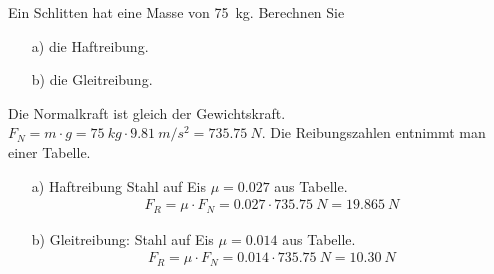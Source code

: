 
\begin{aufgabe}
	Ein Schlitten hat eine Masse von \SI{75}{kg}.
	Berechnen Sie
	\begin{itemize}
		\item [a)] die Haftreibung.
		\item [b)] die Gleitreibung.
	\end{itemize}
	\begin{loesung}
		Die Normalkraft ist gleich der Gewichtskraft. $F_N=m\cdot g=\SI{75}{kg}\cdot\SI{9.81}{m/s^2}=\SI{735.75}{N}$.
		Die Reibungszahlen entnimmt man einer Tabelle.
		\begin{itemize}
			\item[a)] Haftreibung Stahl auf Eis $\mu= 0.027$ aus Tabelle.%
				\begin{eqnarray*}
					F_R=\mu\cdot F_N= \num{0.027}\cdot\SI{735.75}{N}=\SI{19.865}{N}
				\end{eqnarray*}
			\item[b)] Gleitreibung: Stahl auf Eis $\mu= 0.014$ aus Tabelle.%
				\begin{eqnarray*}
					F_R=\mu\cdot F_N=\num{0.014}\cdot\SI{735.75}{N}=\SI{10.30}{N}
				\end{eqnarray*}
		\end{itemize}
	\end{loesung}
\end{aufgabe}
